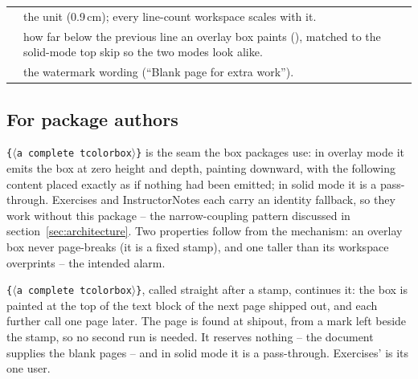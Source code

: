 \begin{center}
\begin{tabularx}{\linewidth}{@{}l Y@{}}
 & the unit (0.9\,cm); every line-count workspace
  scales with it.\\
 & how far below the previous line an overlay box paints
  (), matched to the solid-mode top skip so the two
  modes look alike.\\
 & the watermark wording (``Blank page for extra
  work'').\\
\end{tabularx}
\end{center}

\subsection*{For package authors}

\texttt{\{$\langle$a complete tcolorbox$\rangle$\}} is the
seam the box packages use: in overlay mode it emits the box at zero height
and depth, painting downward, with the following content placed exactly as
if nothing had been emitted; in solid mode it is a pass-through. Exercises
and InstructorNotes each carry an 
 identity fallback, so they work without this package
-- the narrow-coupling pattern discussed in
section~\ref{sec:architecture}. Two properties follow from the mechanism:
an overlay box never page-breaks (it is a fixed stamp), and one taller
than its workspace overprints -- the intended alarm.

\texttt{\{$\langle$a complete tcolorbox$\rangle$\}},
called straight after a  stamp, continues it: the box is
painted at the top of the text block of the next page shipped out, and each
further call one page later. The page is found at shipout, from a mark left
beside the stamp, so no second run is needed. It reserves nothing -- the
document supplies the blank pages -- and in solid mode it is a
pass-through. Exercises'  is its one user.
